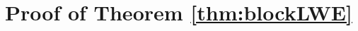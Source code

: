 \documentclass[11pt]{article}
\newcommand{\vect}[1]{\ensuremath{\textbf{#1}}}
\newcommand{\unp}{\ensuremath{\mathtt{unp}}\xspace}
\newcommand{\vA}{\vect{A}}
\begin{document}
%

\section{Proof of Theorem \ref{thm:blockLWE}}
\label{sec:proof of block theorem}
\end{document}
